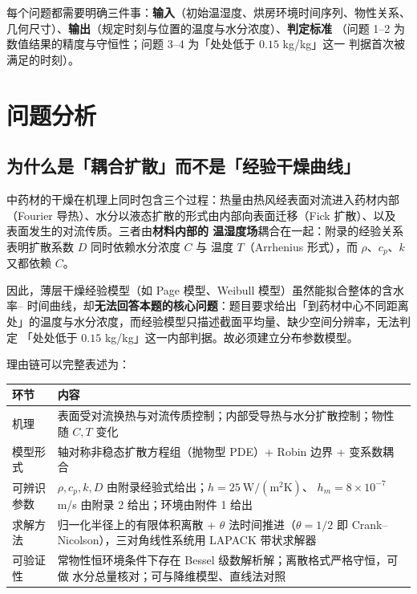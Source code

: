 每个问题都需要明确三件事：\textbf{输入}（初始温湿度、烘房环境时间序列、物性关系、
几何尺寸）、\textbf{输出}（规定时刻与位置的温度与水分浓度）、\textbf{判定标准}
（问题 1--2 为数值结果的精度与守恒性；问题 3--4 为「处处低于 $0.15$ kg/kg」这一
判据首次被满足的时刻）。

\section{问题分析}

\subsection{为什么是「耦合扩散」而不是「经验干燥曲线」}

中药材的干燥在机理上同时包含三个过程：热量由热风经表面对流进入药材内部
（Fourier 导热）、水分以液态扩散的形式由内部向表面迁移（Fick 扩散）、以及
表面发生的对流传质\cite{mujumdar2014,chaedir2019}。三者由\textbf{材料内部的
温湿度场}耦合在一起：附录的经验关系表明扩散系数 $D$ 同时依赖水分浓度 $C$ 与
温度 $T$（Arrhenius 形式），而 $\rho$、$c_p$、$k$ 又都依赖 $C$。

因此，薄层干燥经验模型（如 Page 模型、Weibull 模型）虽然能拟合整体的含水率--
时间曲线，却\textbf{无法回答本题的核心问题}：题目要求给出「到药材中心不同距离
处」的温度与水分浓度，而经验模型只描述截面平均量、缺少空间分辨率，无法判定
「处处低于 $0.15$ kg/kg」这一内部判据。故必须建立分布参数模型。

理由链可以完整表述为：

\begin{center}
\begin{tabular}{p{}p{}}
\toprule[1.2pt]
\textbf{环节} & \textbf{内容} \\
\midrule
机理 & 表面受对流换热与对流传质控制；内部受导热与水分扩散控制；物性随 $C,T$ 变化 \\
模型形式 & 轴对称非稳态扩散方程组（抛物型 PDE）+ Robin 边界 + 变系数耦合 \\
可辨识参数 & $\rho,c_p,k,D$ 由附录经验式给出；$h=25\ \mathrm{W/(m^2K)}$、
  $h_m=8\times10^{-7}$ m/s 由附录 2 给出；环境由附件 1 给出 \\
求解方法 & 归一化半径上的有限体积离散 + $\theta$ 法时间推进（$\theta=1/2$ 即
  Crank--Nicolson），三对角线性系统用 LAPACK 带状求解器 \\
可验证性 & 常物性恒环境条件下存在 Bessel 级数解析解；离散格式严格守恒，可做
  水分总量核对；可与降维模型、直线法对照 \\
\bottomrule[1.2pt]
\end{tabular}
\end{center}

